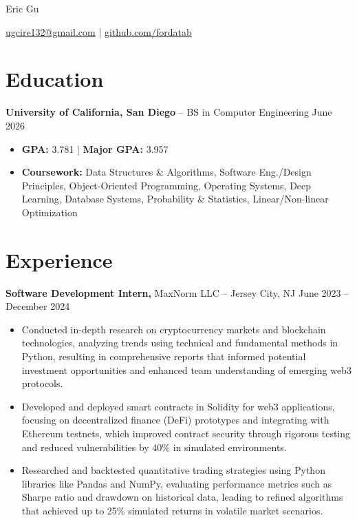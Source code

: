 \documentclass[11pt]{article}       %
\begin{document}
\centerline{\Huge Eric Gu}

\vspace{-4pt}

\centerline{\href{mailto:ugcire132@gmail.com}{ugcire132@gmail.com} |  \href{github.com/fordatab}{github.com/fordatab}}

\vspace{-18.5pt}

\section*{Education}
\textbf{University of California, San Diego} -- BS in Computer Engineering  \hfill June 2026\begin{itemize}[leftmargin=*, nosep]
    \item \textbf{GPA:} 3.781 | \textbf{Major GPA:} 3.957
    \item \textbf{Coursework:} Data Structures \& Algorithms, Software Eng./Design Principles, Object-Oriented Programming, Operating Systems, Deep Learning, Database Systems, Probability \& Statistics, Linear/Non-linear Optimization
\end{itemize}


\vspace{-18.5pt}

\section*{Experience}
\textbf{Software Development Intern,} {MaxNorm LLC} -- Jersey City, NJ \hfill June 2023 -- December 2024 \
\vspace{-9pt}
\begin{itemize}
\item Conducted in-depth research on cryptocurrency markets and blockchain technologies, analyzing trends using technical and fundamental methods in Python, resulting in comprehensive reports that informed potential investment opportunities and enhanced team understanding of emerging web3 protocols.
\item Developed and deployed smart contracts in Solidity for web3 applications, focusing on decentralized finance (DeFi) prototypes and integrating with Ethereum testnets, which improved contract security through rigorous testing and reduced vulnerabilities by 40\% in simulated environments.
\item Researched and backtested quantitative trading strategies using Python libraries like Pandas and NumPy, evaluating performance metrics such as Sharpe ratio and drawdown on historical data, leading to refined algorithms that achieved up to 25\% simulated returns in volatile market scenarios.
\end{itemize}
\end{document}
